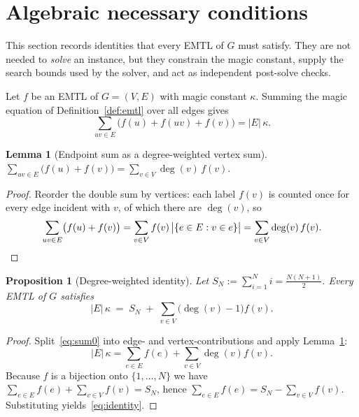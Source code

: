 \documentclass[11pt,a4paper]{article}
\theoremstyle{plain}
\newtheorem{proposition}{Proposition}
\newtheorem{lemma}{Lemma}
\theoremstyle{definition}
\theoremstyle{remark}
\newcommand{\km}{\kappa}
\DeclareMathOperator{\degr}{deg}
\begin{document}
\section{Algebraic necessary conditions}\label{sec:algebra}

This section records identities that every EMTL of $G$ must satisfy. They are not
needed to \emph{solve} an instance, but they constrain the magic constant, supply the
search bounds used by the solver, and act as independent post-solve checks.

Let $f$ be an EMTL of $G=(V,E)$ with magic constant $\km$. Summing the magic equation
of Definition~\ref{def:emtl} over all edges gives
\begin{equation}\label{eq:sum0}
  \sum_{uv\in E}\bigl(f(u)+f(uv)+f(v)\bigr) = |E|\,\km .
\end{equation}

\begin{lemma}[Endpoint sum as a degree-weighted vertex sum]\label{lem:endpoint}
$\displaystyle \sum_{uv\in E}\bigl(f(u)+f(v)\bigr)=\sum_{v\in V}\degr(v)\,f(v).$
\end{lemma}

\begin{proof}
Reorder the double sum by vertices: each label $f(v)$ is counted once for every edge
incident with $v$, of which there are $\degr(v)$, so
\[
  \sum_{uv\in E}\bigl(f(u)+f(v)\bigr)
   =\sum_{v\in V} f(v)\,\bigl|\{e\in E: v\in e\}\bigr|
   =\sum_{v\in V}\degr(v)\,f(v). \qedhere
\]
\end{proof}

\begin{proposition}[Degree-weighted identity]\label{prop:identity}
Let $S_N:=\sum_{i=1}^{N} i=\tfrac{N(N+1)}{2}$. Every EMTL of $G$ satisfies
\begin{equation}\label{eq:identity}
  |E|\,\km \;=\; S_N \;+\; \sum_{v\in V}\bigl(\degr(v)-1\bigr) f(v).
\end{equation}
\end{proposition}

\begin{proof}
Split~\eqref{eq:sum0} into edge- and vertex-contributions and apply
Lemma~\ref{lem:endpoint}:
\[
  |E|\,\km=\sum_{e\in E}f(e)+\sum_{v\in V}\degr(v)f(v).
\]
Because $f$ is a bijection onto $\{1,\dots,N\}$ we have
$\sum_{e\in E}f(e)+\sum_{v\in V}f(v)=S_N$, hence
$\sum_{e\in E}f(e)=S_N-\sum_{v\in V}f(v)$. Substituting yields~\eqref{eq:identity}.
\end{proof}
\end{document}
